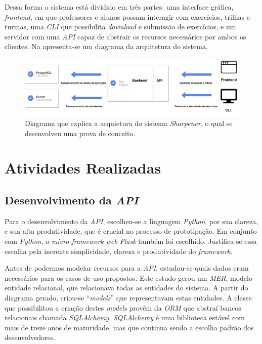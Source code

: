 Dessa forma o sistema está dividido em três partes: uma interface gráfica, \emph{frontend}, 
em que professores e alunos possam interagir com exercícios, trilhas e turmas, uma \emph{CLI} que possibilita 
\emph{download} e submissão de exercícios, e um servidor com uma \emph{API} capaz de abstrair 
os recursos necessários por ambos os clientes. Na  apresenta-se um diagrama 
da arquitetura do sistema.

  \begin{figure}[htpb]
    \centering
    \includegraphics[width=\linewidth]{images/arquitetura.pdf}
    \caption{Diagrama que explica a arquietura do sistema \emph{Sharpener}, o qual 
    se desenvolveu uma prova de conceito.}%
    \label{fig:arquitetura}
  \end{figure}



\section{Atividades Realizadas}
\subsection{Desenvolvimento da \emph{API}}
Para o desenvolvimento da \emph{API}, escolheu-se a linguagem \emph{Python}, por sua clareza, 
e sua alta produtividade, que é crucial no processo de prototipação. Em conjunto com \emph{Python}, 
o \emph{micro framework web} \emph{Flask} também foi escolhido. Justifica-se essa escolha pela
inerente simplicidade, clareza e produtividade do \emph{framework}. 

Antes de podermos modelar recursos para a \emph{API},
estudou-se quais dados eram necessários para os casos de uso propostos. Este estudo gerou um 
\emph{MER}, modelo entidade relacional, que relacionava todas as entidades do sistema. A partir 
do diagrama gerado, criou-se ``\emph{models}'' que representavam estas entidades. A classe 
que possibilitou a criação destes \emph{models} provêm da \emph{ORM} que abstraí bancos 
relacionais chamada \hyperref[link:sqlalchemy]{\emph{SQLAlchemy}}. \hyperref[link:sqlalchemy]{\emph{SQLAlchemy}}
é uma biblioteca estável com mais de treze anos de maturidade,
mas que continua sendo a escolha padrão dos desenvolvedores.

